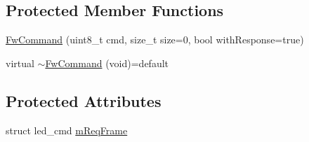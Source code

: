 \subsection*{Protected Member Functions}
\begin{DoxyCompactItemize}
\item 
\hyperlink{class_wy_light_1_1_fw_command_a19f7445d6240e218881903aff767b2a8}{Fw\-Command} (uint8\-\_\-t cmd, size\-\_\-t size=0, bool with\-Response=true)
\item 
virtual \hyperlink{class_wy_light_1_1_fw_command_aa3631efbb779f06a2813cdc4f44a6f48}{$\sim$\-Fw\-Command} (void)=default
\end{DoxyCompactItemize}
\subsection*{Protected Attributes}
\begin{DoxyCompactItemize}
\item 
struct led\-\_\-cmd \hyperlink{class_wy_light_1_1_fw_command_a9c16cbc6d789b240a43b95c74c608353}{m\-Req\-Frame}
\end{DoxyCompactItemize}


